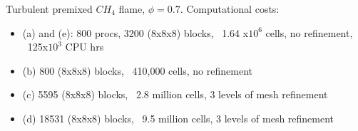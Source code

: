 \documentclass{beamer}
\begin{document}
\begin{frame}
\begin{minipage}[t][1\textheight]{1\textwidth}
\begin{exampleblock}{Turbulent premixed $CH_4$ flame, $\phi=0.7$. }
Computational costs:
\begin{itemize}
\tiny
\item (a) and (e): 800 procs, 3200 (8x8x8) blocks, ~1.64 x$10^6$ cells, no refinement, ~125x$10^3$ CPU hrs 
\item (b) 800 (8x8x8) blocks, ~410,000 cells,  no refinement
\item (c) 5595 (8x8x8) blocks, ~2.8 million cells, 3 levels of mesh refinement
\item (d) 18531 (8x8x8) blocks, ~9.5 million cells, 3 levels of mesh refinement
\end{itemize}

\end{exampleblock}
\end{minipage}


\end{frame}

\end{document}
